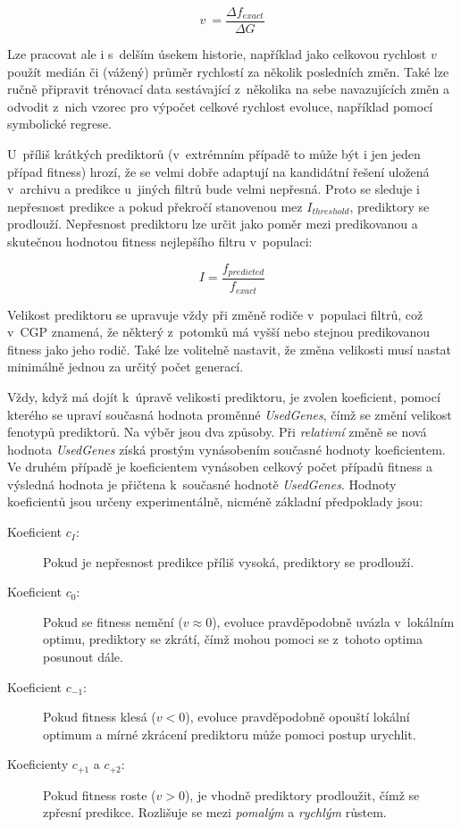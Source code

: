 \begin{equation}
    \label{eqVelocity}
    v~= \frac{\Delta{}f_{\mathit{exact}}}{\Delta{}G}
\end{equation}

Lze pracovat ale i s~delším úsekem historie, například jako celkovou rychlost $v$ použít medián či (vážený) průměr rychlostí za několik posledních změn. Také lze ručně připravit trénovací data sestávající z~několika na sebe navazujících změn a odvodit z~nich vzorec pro výpočet celkové rychlost evoluce, například pomocí symbolické regrese.

U~příliš krátkých prediktorů (v~extrémním případě to může být i jen jeden případ fitness) hrozí, že se velmi dobře adaptují na kandidátní řešení uložená v~archivu a predikce u~jiných filtrů bude velmi nepřesná. Proto se sleduje i nepřesnost predikce a pokud překročí stanovenou mez $I_\mathit{threshold}$, prediktory se prodlouží. Nepřesnost prediktoru lze určit jako poměr mezi predikovanou a skutečnou hodnotou fitness nejlepšího filtru v~populaci:

\begin{equation}
    \label{eqInaccuracy}
    \mathit{I} = \frac{f_{\mathit{predicted}}}{f_{\mathit{exact}}}
\end{equation}

Velikost prediktoru se upravuje vždy při změně rodiče v~populaci filtrů, což v~CGP znamená, že některý z~potomků má vyšší nebo stejnou predikovanou fitness jako jeho rodič. Také lze volitelně nastavit, že změna velikosti musí nastat minimálně jednou za určitý počet generací.

Vždy, když má dojít k~úpravě velikosti prediktoru, je zvolen koeficient, pomocí kterého se upraví současná hodnota proměnné \emph{UsedGenes}, čímž se změní velikost fenotypů prediktorů. Na výběr jsou dva způsoby. Při \emph{relativní} změně se nová hodnota \emph{UsedGenes} získá prostým vynásobením současné hodnoty koeficientem. Ve druhém případě je koeficientem vynásoben celkový počet případů fitness a výsledná hodnota je přičtena k~současné hodnotě \emph{UsedGenes}. Hodnoty koeficientů jsou určeny experimentálně, nicméně základní předpoklady jsou:

\begin{description}
    \item[Koeficient $c_I$:] Pokud je nepřesnost predikce příliš vysoká, prediktory se prodlouží.
    \item[Koeficient $c_{0}$:] Pokud se fitness nemění ($v \approx 0$), evoluce pravděpodobně uvázla v~lokálním optimu, prediktory se zkrátí, čímž mohou pomoci se z~tohoto optima posunout dále.
    \item[Koeficient $c_{-1}$:] Pokud fitness klesá ($v < 0$), evoluce pravděpodobně opouští lokální optimum a mírné zkrácení prediktoru může pomoci postup urychlit.
    \item[Koeficienty $c_{+1}$ a $c_{+2}$:] Pokud fitness roste ($v > 0$), je vhodně prediktory prodloužit, čímž se zpřesní predikce. Rozlišuje se mezi \emph{pomalým} a \emph{rychlým} růstem.
\end{description}

